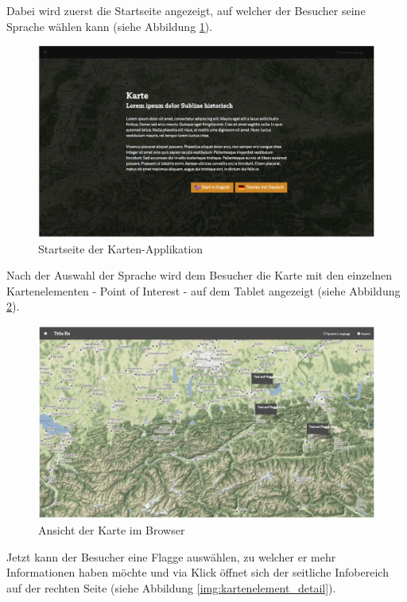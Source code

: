 Dabei wird zuerst die Startseite angezeigt, auf welcher der Besucher seine Sprache wählen kann (siehe Abbildung \ref{img:startseite_kartenapp}).

\begin{figure}[ht!]
\centering
\includegraphics[width=12cm]{Figures/paula/karte/startseite_kartenapp.png}
\caption{Startseite der Karten-Applikation}
\label{img:startseite_kartenapp}
\end{figure}

Nach der Auswahl der Sprache wird dem Besucher die Karte mit den einzelnen Kartenelementen - Point of Interest - auf dem Tablet angezeigt (siehe Abbildung \ref{img:karte_browser}).

\begin{figure}[ht!]
\centering
\includegraphics[width=12cm]{Figures/paula/karte/karte_browser.png}
\caption{Ansicht der Karte im Browser}
\label{img:karte_browser}
\end{figure}

Jetzt kann der Besucher eine Flagge auswählen, zu welcher er mehr Informationen haben möchte und via Klick öffnet sich der seitliche Infobereich auf der rechten Seite (siehe Abbildung \ref{img:kartenelement_detail}).

